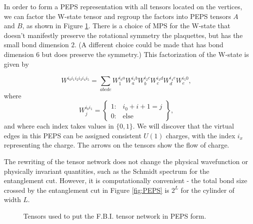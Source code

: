In order to form a PEPS representation with all tensors located on the vertices, we can factor the W-state tensor and regroup the factors into PEPS tensors $A$ and $B$, as shown in Figure \ref{fig:FBI_PEPS_2}. 
There is a choice of MPS for the W-state that doesn't manifestly preserve the rotational symmetry the plaquettes, but has the small bond dimension $2$. (A different choice could be made that has bond dimension 6 but does preserve the symmetry.) This factorization of the W-state is given by

$$
W^{i_0 i_1 i_2 i_3 i_4 i_5} = \sum\limits_{abcde} W^{i_0 a}_{1} W^{i_1 b}_{a} W^{i_2 c}_{b} W^{i_3 d}_{c} W^{i_4 e}_{d} W^{i_5 0}_{e},
$$
where 
$$ W^{i_0 i_1}_{j}  = \left\{ \begin{array}{lr}
													1  : & i_0+i+1 = j \\
													0  : & \text{else}
													\end{array}
											\right\},
$$
and where each index takes values in $\{0, 1\}$. We will discover that the virtual edges in this PEPS can be assigned consistent $U(1)$ charges, with the index $i_x$ representing the charge. The arrows on the tensors show the flow of charge.

The rewriting of the tensor network does not change the physical wavefunction or physically invariant quantities, such as the Schmidt spectrum for the entanglement cut. However, it is computationally convenient - the total bond size crossed by the entanglement cut in Figure \ref{fig:PEPS} is $2^L$ for the cylinder of width $L$.

\begin{figure}[H]
	\centering
	\quad
		
%
\caption{ Tensors used to put the F.B.I. tensor network in PEPS form. }
\label{fig:FBI_PEPS_2}
\end{figure}

